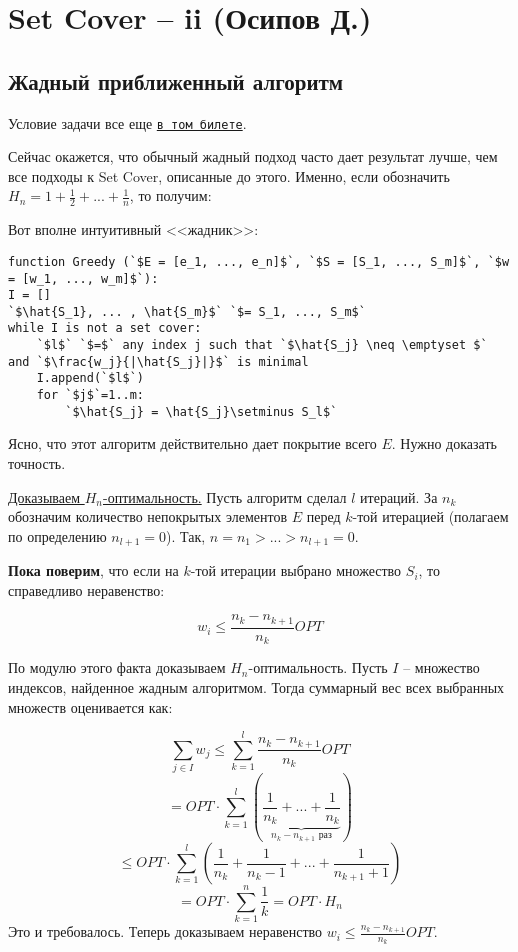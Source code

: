 \section{Set Cover -- ii (Осипов Д.)}
\subsection{Жадный приближенный алгоритм}
Условие задачи все еще \hyperlink{setcover}{\texttt{в том билете}}.

Сейчас окажется, что обычный жадный подход часто дает результат лучше, чем все подходы к Set Cover, описанные до этого. Именно, если обозначить $H_n = 1 + \frac{1}{2} + ... + \frac{1}{n}$, то получим:


Вот вполне интуитивный <<жадник>>:

\begin{lstlisting}[escapeinside=``]
function Greedy (`$E = [e_1, ..., e_n]$`, `$S = [S_1, ..., S_m]$`, `$w = [w_1, ..., w_m]$`):
I = []
`$\hat{S_1}, ... , \hat{S_m}$` `$= S_1, ..., S_m$`
while I is not a set cover:
    `$l$` `$=$` any index j such that `$\hat{S_j} \neq \emptyset $` and `$\frac{w_j}{|\hat{S_j}|}$` is minimal
    I.append(`$l$`)
    for `$j$`=1..m:
        `$\hat{S_j} = \hat{S_j}\setminus S_l$`
\end{lstlisting}

Ясно, что этот алгоритм действительно дает покрытие всего $E$. Нужно доказать точность.

\underline{Доказываем $H_n$-оптимальность.} Пусть алгоритм сделал $l$ итераций. За $n_k$ обозначим количество непокрытых элементов $E$ перед $k$-той итерацией (полагаем по определению $n_{l+1}=0$). Так, $n = n_1 > ... > n_{l+1} = 0$. 

\textbf{Пока поверим}, что если на $k$-той итерации выбрано множество $S_i$, то справедливо неравенство:

$$w_i \leq \frac{n_k - n_{k+1}}{n_k}OPT$$

По модулю этого факта доказываем $H_n$-оптимальность. Пусть $I$ -- множество индексов, найденное жадным алгоритмом. Тогда суммарный вес всех выбранных множеств оценивается как:

$$\sum_{j\in I} w_j \leq \sum^l_{k=1}\frac{n_k-n_{k+1}}{n_k} OPT$$ 
$$ = OPT\cdot\sum^l_{k=1}(\underbrace{\frac{1}{n_k} + ... + \frac{1}{n_k}}_{n_k-n_{k+1}\text{ раз}})$$
$$ \leq OPT \cdot\sum^l_{k=1} (\frac{1}{n_k} + \frac{1}{n_k - 1} + ... + \frac{1}{n_{k+1}+1})$$ 
$$ = OPT\cdot\sum^n_{k=1}\frac{1}{k} = OPT\cdot H_n$$
Это и требовалось. Теперь доказываем неравенство $w_i \leq \frac{n_k - n_{k+1}}{n_k}OPT$.

